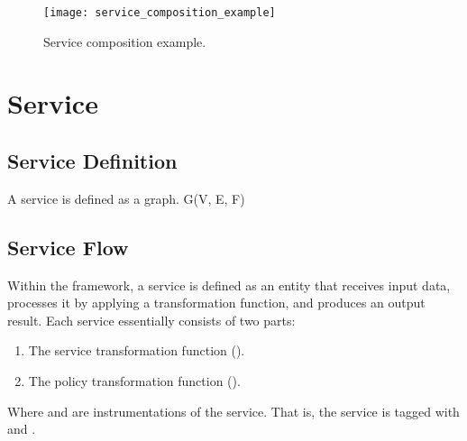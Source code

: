 \begin{figure}
  \texttt{[image: service\_composition\_example]}
  \caption{Service composition example.}\label{fig:service_composition_example}

\end{figure}



\section{Service}
\subsection{Service Definition}

A service is defined as a graph. G(V, E, F)

\subsection{Service Flow}
Within the framework, a service is defined as an entity that receives input data, processes it by applying a transformation function, and produces an output result. Each service essentially consists of two parts:
\begin{enumerate}
  \item The service transformation function ().
  \item The policy transformation function ().
\end{enumerate}
Where \myGamma and \myLambda are instrumentations of the service. That is, the service is tagged with \myLambda and \myGamma.

